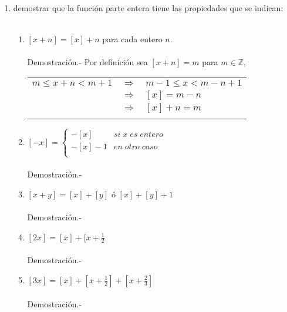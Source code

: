 \begin{enumerate}
\begin{enumerate}[\bfseries (a)]
	\end{enumerate}
	
	\item demostrar que la función parte entera  tiene las propiedades que se indican:\\\\

	\begin{enumerate}[\bfseries (a)]

	    \item $[x+n] = [x] + n$ para cada entero $n$.\\\\
		Demostración.-\; Por definición sea $[x+n]=m$ para $m\in \mathbb{Z}$,
		\begin{center}
		    \begin{tabular}{rcl}
			$m \leq x+n < m+1$ & $\Longrightarrow$ & $m-1 \leq x < m-n+1$\\
			 & $\Longrightarrow$ & $[x]=m-n$\\
			 & $\Longrightarrow$ & $[x]+n=m$\\\\
		    \end{tabular}
		\end{center}

	    \item $[-x] = \left\{ 
		    \begin{array}{ll} 
			-[x] & si \; x \; es \; entero \\ 
			-[x] - 1 & en \; otro \; caso\\
		    \end{array} 
		\right.$ \\\\
		Demostración.-\; 

	    \item $[x+y] = [x] + [y]$ ó $[x] + [y] + 1$\\\\
		Demostración.-\;

	    \item  $[2x] = [x] + [x + \frac{1}{2}$\\\\
		Demostración.-\;

	    \item $[3x] = [x] + [x + \frac{1}{2}] + [x + \frac{2}{3}]$\\\\
		Demostración.-\;

	\end{enumerate}

	

    \end{enumerate}
    
